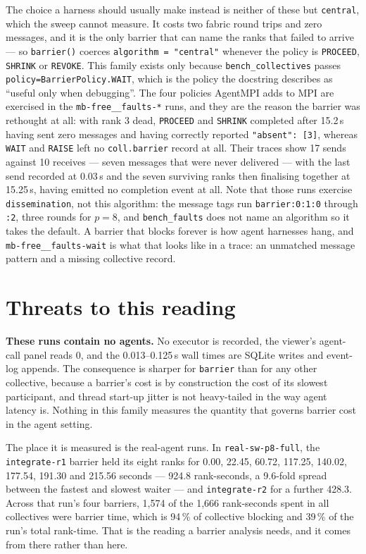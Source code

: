 \documentclass[11pt]{article}
\begin{document}
The choice a harness should usually make instead is neither of these but \texttt{central},
which the sweep cannot measure. It costs two fabric round trips and zero messages, and it is
the only barrier that can name the ranks that failed to arrive --- so \texttt{barrier()}
coerces \texttt{algorithm = "central"} whenever the policy is \texttt{PROCEED},
\texttt{SHRINK} or \texttt{REVOKE}. This family exists only because
\texttt{bench\_collectives} passes \texttt{policy=BarrierPolicy.WAIT}, which is the policy the
docstring describes as ``useful only when debugging''. The four policies AgentMPI adds to MPI
are exercised in the \texttt{mb-free\_\_faults-*} runs, and they are the reason the barrier was
rethought at all: with rank 3 dead, \texttt{PROCEED} and \texttt{SHRINK} completed after 15.2\,s
having sent zero messages and having correctly reported \texttt{"absent": [3]}, whereas
\texttt{WAIT} and \texttt{RAISE} left no \texttt{coll.barrier} record at all. Their traces show
17 sends against 10 receives --- seven messages that were never delivered --- with the last send
recorded at 0.03\,s and the seven surviving ranks then finalising together at 15.25\,s, having
emitted no completion event at all. Note that those runs exercise \texttt{dissemination}, not this
algorithm: the message tags run \texttt{barrier:0:1:0} through \texttt{:2}, three rounds for
$p=8$, and \texttt{bench\_faults} does not name an algorithm so it takes the default. A
barrier that blocks forever is how agent harnesses hang, and \texttt{mb-free\_\_faults-wait} is
what that looks like in a trace: an unmatched message pattern and a missing collective record.

\section{Threats to this reading}

\textbf{These runs contain no agents.} No executor is recorded, the viewer's agent-call panel
reads 0, and the 0.013--0.125\,s wall times are SQLite writes and event-log appends. The
consequence is sharper for \texttt{barrier} than for any other collective, because a barrier's
cost is by construction the cost of its slowest participant, and thread start-up jitter is not
heavy-tailed in the way agent latency is. Nothing in this family measures the quantity that
governs barrier cost in the agent setting.

The place it is measured is the real-agent runs. In \texttt{real-sw-p8-full}, the
\texttt{integrate-r1} barrier held its eight ranks for 0.00, 22.45, 60.72, 117.25, 140.02,
177.54, 191.30 and 215.56 seconds --- 924.8 rank-seconds, a 9.6-fold spread between the fastest
and slowest waiter --- and \texttt{integrate-r2} for a further 428.3. Across that run's four
barriers, 1,574 of the 1,666 rank-seconds spent in all collectives were barrier time, which is
94\,\% of collective blocking and 39\,\% of the run's total rank-time. That is the reading a
barrier analysis needs, and it comes from there rather than here.
\end{document}
